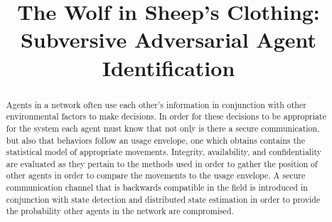 \documentclass[conference]{IEEEtran}
\begin{document}
%
\title{The Wolf in Sheep's Clothing:\\
Subversive Adversarial Agent Identification}


\author{
}



\maketitle

\begin{abstract}

Agents in a network often use each other's information in conjunction with other environmental factors to make decisions. In order for these decisions to be appropriate for the system each agent must know that not only is there a secure communication, but also that behaviors follow an usage envelope, one which obtains contains the statistical model of appropriate movements. Integrity, availability, and confidentiality are evaluated as they pertain to the methods used in order to gather the position of other agents in order to compare the movements to the usage envelope. A secure communication channel that is backwards compatible in the field is introduced in conjunction with state detection and distributed state estimation in order to provide the probability other agents in the network are compromised.

\end{abstract}
\end{document}
